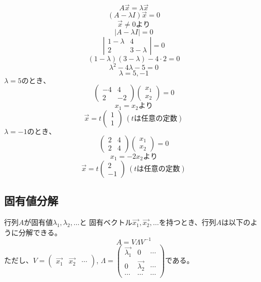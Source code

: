 \documentclass[b5paper,12pt]{jarticle}
\begin{document}
\[
    A\vec{x}=\lambda\vec{x}
\]
\[
    (A-\lambda I)\vec{x}=0
\]
\[
    \vec{x}\neq0より
\]
\[
    |A-\lambda I|=0
\]
\[
    \left|
    \begin{array}{cc}
        1-\lambda & 4 \\
        2 & 3-\lambda 
    \end{array}
    \right|=0
\]
\[
    (1-\lambda)(3-\lambda)-4\cdot2=0
\]
\[
    \lambda^2-4\lambda-5=0
\]
\[
    \lambda=5,-1
\]
$\lambda=5のとき、$
\[
    \left(
    \begin{array}{cc}
        -4 & 4 \\
        2 & -2 
    \end{array}
    \right) 
    \left(
        \begin{array}{c}
            x_1 \\
            x_2 
        \end{array}
    \right) 
    =0
\]
\[
    x_1=x_2より
\]
\[
    \vec{x}=t
    \left(
        \begin{array}{c}
            1 \\
            1 
        \end{array}
    \right)
    ~(tは任意の定数)
\]
$\lambda=-1のとき、$
\[
    \left(
    \begin{array}{cc}
        2 & 4 \\
        2 & 4 
    \end{array}
    \right) 
    \left(
        \begin{array}{c}
            x_1 \\
            x_2 
        \end{array}
    \right) 
    =0
\]
\[
    x_1=-2x_2より
\]
\[
    \vec{x}=t
    \left(
        \begin{array}{c}
            2 \\
            -1 
        \end{array}
    \right)
    ~(tは任意の定数)
\]
\subsection{固有値分解}
行列$A$が固有値$\lambda_1,\lambda_2,\ldots$と
固有ベクトル$\vec{x_1},\vec{x_2},\ldots$を持つとき、行列$A$は以下のように分解できる。
\[
    A=V\Lambda V^{-1}
\]
ただし、$V=\left(
    \begin{array}{ccc}
        \vec{x_1} & \vec{x_2} & \cdots
    \end{array}
\right)
$, $\Lambda=\left(
    \begin{array}{ccc} 
        \vec{\lambda_1} & 0 & \cdots \\
        0 & \vec{\lambda_2} & \cdots \\
        \cdots & \cdots & \cdots 
    \end{array}
\right)$である。
\end{document}
